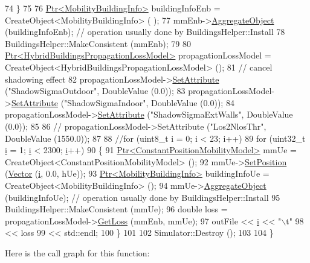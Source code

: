 \begin{DoxyCode}
74     \}
75   
76   \hyperlink{classns3_1_1Ptr}{Ptr<MobilityBuildingInfo>} buildingInfoEnb = CreateObject<MobilityBuildingInfo> (
      );
77   mmEnb->\hyperlink{classns3_1_1Object_a79dd435d300f3deca814553f561a2922}{AggregateObject} (buildingInfoEnb); \textcolor{comment}{// operation usually done by
       BuildingsHelper::Install}
78   BuildingsHelper::MakeConsistent (mmEnb);
79   
80   \hyperlink{classns3_1_1Ptr}{Ptr<HybridBuildingsPropagationLossModel>} propagationLossModel = 
      CreateObject<HybridBuildingsPropagationLossModel> ();
81   \textcolor{comment}{// cancel shadowing effect}
82   propagationLossModel->\hyperlink{classns3_1_1ObjectBase_ac60245d3ea4123bbc9b1d391f1f6592f}{SetAttribute} (\textcolor{stringliteral}{"ShadowSigmaOutdoor"}, DoubleValue (0.0));
83   propagationLossModel->\hyperlink{classns3_1_1ObjectBase_ac60245d3ea4123bbc9b1d391f1f6592f}{SetAttribute} (\textcolor{stringliteral}{"ShadowSigmaIndoor"}, DoubleValue (0.0));
84   propagationLossModel->\hyperlink{classns3_1_1ObjectBase_ac60245d3ea4123bbc9b1d391f1f6592f}{SetAttribute} (\textcolor{stringliteral}{"ShadowSigmaExtWalls"}, DoubleValue (0.0));
85   
86 \textcolor{comment}{//   propagationLossModel->SetAttribute ("Los2NlosThr", DoubleValue (1550.0));}
87   
88   \textcolor{comment}{//for (uint8\_t i = 0; i < 23; i++)}
89   \textcolor{keywordflow}{for} (uint32\_t \hyperlink{bernuolliDistribution_8m_a6f6ccfcf58b31cb6412107d9d5281426}{i} = 1; \hyperlink{bernuolliDistribution_8m_a6f6ccfcf58b31cb6412107d9d5281426}{i} < 2300; \hyperlink{bernuolliDistribution_8m_a6f6ccfcf58b31cb6412107d9d5281426}{i}++)
90     \{
91       \hyperlink{classns3_1_1Ptr}{Ptr<ConstantPositionMobilityModel>} mmUe = 
      CreateObject<ConstantPositionMobilityModel> ();
92       mmUe->\hyperlink{classns3_1_1MobilityModel_ac584b3d5a309709d2f13ed6ada1e7640}{SetPosition} (\hyperlink{classns3_1_1Vector3D_a7e59b47bc94c9cb1dadff68c1d0112d8}{Vector} (\hyperlink{bernuolliDistribution_8m_a6f6ccfcf58b31cb6412107d9d5281426}{i}, 0.0, hUe));
93       \hyperlink{classns3_1_1Ptr}{Ptr<MobilityBuildingInfo>} buildingInfoUe = 
      CreateObject<MobilityBuildingInfo> ();
94       mmUe->\hyperlink{classns3_1_1Object_a79dd435d300f3deca814553f561a2922}{AggregateObject} (buildingInfoUe); \textcolor{comment}{// operation usually done by
       BuildingsHelper::Install}
95       BuildingsHelper::MakeConsistent (mmUe);
96       \textcolor{keywordtype}{double} loss = propagationLossModel->\hyperlink{classns3_1_1HybridBuildingsPropagationLossModel_a241f98b865eb28321e724c6963ba4f83}{GetLoss} (mmEnb, mmUe);
97       outFile << \hyperlink{bernuolliDistribution_8m_a6f6ccfcf58b31cb6412107d9d5281426}{i} << \textcolor{stringliteral}{"\(\backslash\)t"}
98               << loss 
99               << std::endl;
100     \}
101     
102   Simulator::Destroy ();
103   
104 \}
\end{DoxyCode}


Here is the call graph for this function\+:


